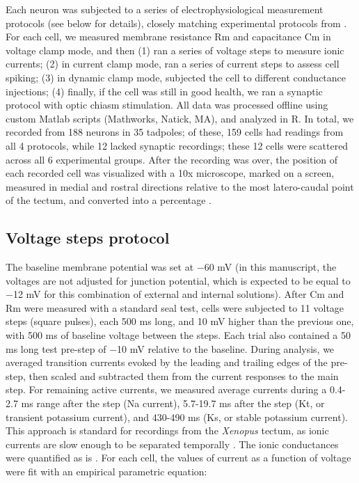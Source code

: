 \documentclass{article}
\begin{document}
Each neuron was subjected to a series of electrophysiological measurement protocols (see below for details), closely matching experimental protocols from \citep{ciarleglio2015}. For each cell, we measured membrane resistance Rm and capacitance Cm in voltage clamp mode, and then (1) ran a series of voltage steps to measure ionic currents; (2) in current clamp mode, ran a series of current steps to assess cell spiking; (3) in dynamic clamp mode, subjected the cell to different conductance injections; (4) finally, if the cell was still in good health, we ran a synaptic protocol with optic chiasm stimulation. All data was processed offline using custom Matlab scripts (Mathworks, Natick, MA), and analyzed in R. In total, we recorded from 188 neurons in 35 tadpoles; of these, 159 cells had readings from all 4 protocols, while 12 lacked synaptic recordings; these 12 cells were scattered across all 6 experimental groups. After the recording was over, the position of each recorded cell was visualized with a 10x microscope, marked on a screen, measured in medial and rostral directions relative to the most latero-caudal point of the tectum, and converted into a percentage \citep{hamodi2014}.

\subsection*{Voltage steps protocol}

The baseline membrane potential was set at $-$60 mV (in this manuscript, the voltages are not adjusted for junction potential, which is expected to be equal to $-$12 mV for this combination of external and internal solutions). After Cm and Rm were measured with a standard seal test, cells were subjected to 11 voltage steps (square pulses), each 500 ms long, and 10 mV higher than the previous one, with 500 ms of baseline voltage between the steps. Each trial also contained a 50 ms long test pre-step of $-$10 mV relative to the baseline. During analysis, we averaged transition currents evoked by the leading and trailing edges of the pre-step, then scaled and subtracted them from the current responses to the main step. For remaining active currents, we measured average currents during a 0.4-2.7 ms range after the step (Na current), 5.7-19.7 ms after the step (Kt, or transient potassium current), and 430-490 ms (Ks, or stable potassium current). This approach is standard for recordings from the \textit{Xenopus} tectum, as ionic currents are slow enough to be separated temporally \citep{aizenman2003}. The ionic conductances were quantified as is \citep{ciarleglio2015}. For each cell, the values of current as a function of voltage were fit with an empirical parametric equation:
\end{document}

